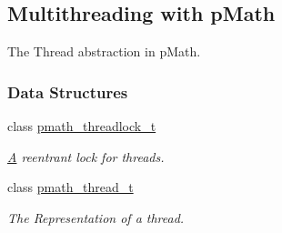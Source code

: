 \hypertarget{group__threads}{
\subsection{Multithreading with pMath}
\label{group__threads}
}
The Thread abstraction in pMath.  


\subsubsection*{Data Structures}
\begin{CompactItemize}
\item 
class \hyperlink{classpmath__threadlock__t}{pmath\_\-threadlock\_\-t}
\begin{CompactList}\small\item\em \hyperlink{class_a}{A} reentrant lock for threads. \item\end{CompactList}\item 
class \hyperlink{classpmath__thread__t}{pmath\_\-thread\_\-t}
\begin{CompactList}\small\item\em The Representation of a thread. \item\end{CompactList}\end{CompactItemize}
